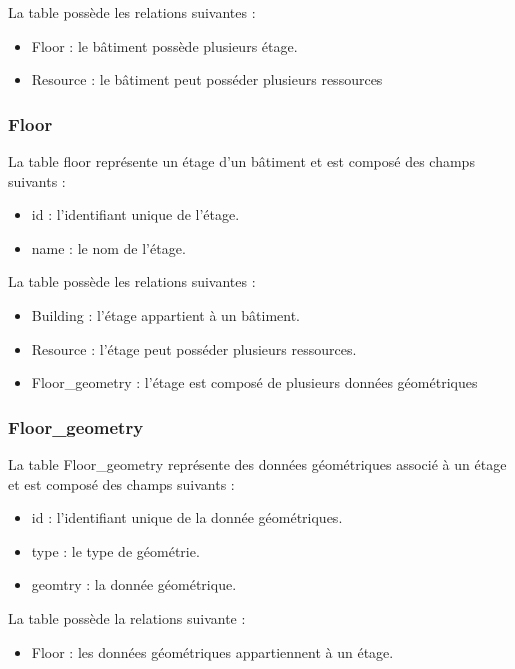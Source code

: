 \documentclass[
    iai, %
    il, %
]{heig-tb}
\begin{document}
La table possède les relations suivantes :
\begin{itemize}
    \item Floor : le bâtiment possède plusieurs étage.
    \item Resource : le bâtiment peut posséder plusieurs ressources
\end{itemize}

\subsubsection{Floor}
La table floor représente un étage d'un bâtiment et est composé des champs suivants :

\begin{itemize}
    \item id : l'identifiant unique de l'étage.
    \item name : le nom de l'étage.
\end{itemize}

La table possède les relations suivantes :
\begin{itemize}
    \item Building : l'étage appartient à un bâtiment.
    \item Resource : l'étage peut posséder plusieurs ressources.
    \item Floor\_geometry : l'étage est composé de plusieurs données géométriques
\end{itemize}

\subsubsection{Floor\_geometry}
La table Floor\_geometry représente des données géométriques associé à un étage et est composé des champs suivants :

\begin{itemize}
    \item id : l'identifiant unique de la donnée géométriques.
    \item type : le type de géométrie.
    \item geomtry : la donnée géométrique.
\end{itemize}

La table possède la relations suivante :
\begin{itemize}
    \item Floor : les données géométriques appartiennent à un étage.
\end{itemize}
\end{document}
